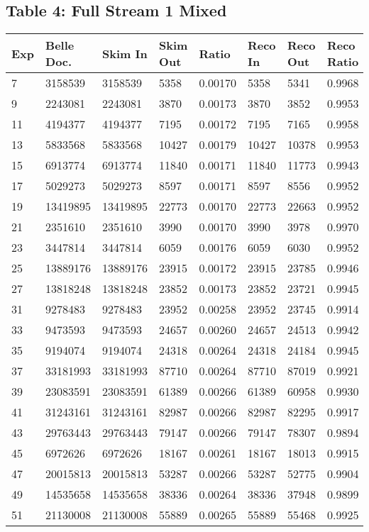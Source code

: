 \documentclass[11pt]{article}
\begin{document}
\subsection{Table 4: Full Stream 1 Mixed}
\begin{tabular}{ | l || l | l | l | l || l | l | l |}
  \hline
  Exp&Belle Doc.&Skim In&Skim Out&Ratio&Reco In&Reco Out&Reco Ratio\\
  \hline \hline
  7&3158539&3158539&5358&0.00170&5358&5341&0.9968\\\hline
  9&2243081&2243081&3870&0.00173&3870&3852&0.9953\\\hline
  11&4194377&4194377&7195&0.00172&7195&7165&0.9958\\\hline
  13&5833568&5833568&10427&0.00179&10427&10378&0.9953\\\hline
  15&6913774&6913774&11840&0.00171&11840&11773&0.9943\\\hline
  17&5029273&5029273&8597&0.00171&8597&8556&0.9952\\\hline
  19&13419895&13419895&22773&0.00170&22773&22663&0.9952\\\hline
  21&2351610&2351610&3990&0.00170&3990&3978&0.9970\\\hline
  23&3447814&3447814&6059&0.00176&6059&6030&0.9952\\\hline
  25&13889176&13889176&23915&0.00172&23915&23785&0.9946\\\hline
  27&13818248&13818248&23852&0.00173&23852&23721&0.9945\\\hline
  \hline
  31&9278483&9278483&23952&0.00258&23952&23745&0.9914\\\hline
  33&9473593&9473593&24657&0.00260&24657&24513&0.9942\\\hline
  35&9194074&9194074&24318&0.00264&24318&24184&0.9945\\\hline
  37&33181993&33181993&87710&0.00264&87710&87019&0.9921\\\hline
  39&23083591&23083591&61389&0.00266&61389&60958&0.9930\\\hline
  41&31243161&31243161&82987&0.00266&82987&82295&0.9917\\\hline
  43&29763443&29763443&79147&0.00266&79147&78307&0.9894\\\hline
  45&6972626&6972626&18167&0.00261&18167&18013&0.9915\\\hline
  47&20015813&20015813&53287&0.00266&53287&52775&0.9904\\\hline
  49&14535658&14535658&38336&0.00264&38336&37948&0.9899\\\hline
  51&21130008&21130008&55889&0.00265&55889&55468&0.9925\\\hline

\end{tabular}
\end{document}
